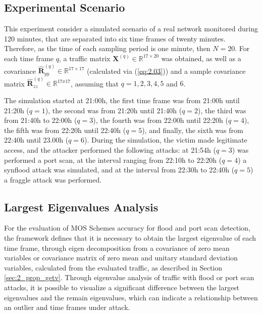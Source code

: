 \subsection{Experimental Scenario}
\label{sec:2_AnalyzedScenario}

This experiment consider a simulated scenario of a real network monitored during 120 minutes, that are separated into six time frames of twenty minutes. Therefore, as the time of each sampling period is one minute, then $N = 20$. For each time frame $q$, a traffic matrix $\pmb{X}^{(q)} \in \mathbb{R}^{17 \times 20}$ was obtained, as well as a covariance $\hat{\pmb{R}}_{yy}^{(q)} \in \mathbb{R}^{17 \times 17}$ (calculated via (\ref{eq:2.03})) and a sample covariance matrix $\hat{\pmb{R}}_{zz}^{(q)} \in \mathbb{R}^{17x17}$, assuming that $q = 1, 2, 3, 4, 5$ and $6$. 

The simulation started at 21:00h, the first time frame was from 21:00h until 21:20h ($q = 1$), the second was from 21:20h until 21:40h ($q = 2$), the third was from 21:40h to 22:00h ($q = 3$), the fourth was from 22:00h until 22:20h ($q = 4$), the fifth was from 22:20h until 22:40h ($q = 5$), and finally, the sixth was from 22:40h until 23.00h ($q = 6$). During the simulation, the victim made legitimate access, and the attacker performed the following attacks: at 21:54h ($q = 3$) was performed a port scan, at the interval ranging from 22:10h to 22:20h ($q = 4$) a synflood attack was simulated, and at the interval from 22:30h to 22:40h ($q = 5$) a fraggle attack was performed.

\subsection{Largest Eigenvalues Analysis}
\label{sec:2_largesteigenvaluesanalysis}

For the evaluation of MOS Schemes accuracy for flood and port scan detection, the framework defines that it is necessary to obtain the largest eigenvalue of each time frame, through eigen decomposition from a covariance of zero mean variables or covariance matrix of zero mean and unitary standard deviation variables, calculated from the evaluated traffic, as described in Section \ref{sec:2_prop_getv}. Through eigenvalue analysis of traffic with flood or port scan attacks, it is possible to visualize a significant difference between the largest eigenvalues and the remain eigenvalues, which can indicate a relationship between an outlier and time frames under attack.

